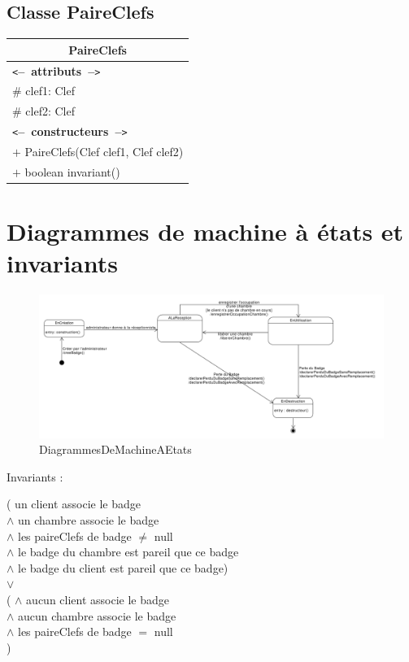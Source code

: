 \documentclass[11pt,article]{article}
\newcommand{\cmt}[1]{\texttt{<}\textbf{--~#1~--}\texttt{>}}
\begin{document}
  \subsection{Classe \textsf{PaireClefs}}
  \begin{center}
	  \begin{longtable}{|p{15cm}|}
		  \hline
		  \multicolumn{1}{|c|}{{\Large \textsf{PaireClefs}}} \\
		  \hline
		  \cmt{attributs}\\
		  $\#$ clef1: Clef \\
		  $\#$ clef2: Clef \\
		  \hline
		  \cmt{constructeurs} \\
          $+$ PaireClefs(Clef clef1, Clef clef2) \\
		  $+$ boolean invariant() \\
		  \hline
	  \end{longtable}
  \end{center}


\section{Diagrammes de machine à états et invariants}


\begin{figure}[h!]
  \includegraphics[width=1.3\textwidth,center]{DiagrammesDeMachineAEtats/badge_d_acces}
  \caption{DiagrammesDeMachineAEtats}
  \label{badge_d_acces}

\end{figure}
\bigskip



Invariants :
\bigskip

					( un client associe le badge \\
									\hspace{1cm} $\land$ un chambre associe le badge\\
									\hfill $\land$ les paireClefs de badge $\neq$ null\\
									$\land$ le badge du chambre est pareil que ce badge\\
									$\land$ le badge du client est pareil que ce badge)\\
							$\lor$ \\ (
									$\land$ aucun client associe le badge\\
									$\land$ aucun chambre associe le badge\\
									$\land$ les paireClefs de badge $=$ null\\
							)
\end{document}
